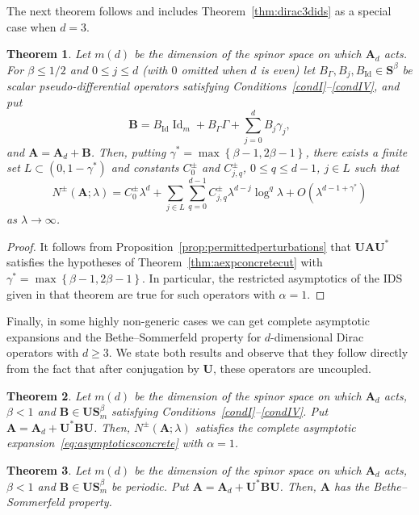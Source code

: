 \documentclass[10pt]{amsart}
\newtheorem{theo}{Theorem}[section]
\theoremstyle{definition}\newtheorem{defi}[theo]{Definition}\newtheorem{rema}[theo]{Remark}\newtheorem{exam}[theo]{Example}\newtheorem{nota}[theo]{Notation}
\DeclareMathOperator{\Id}{Id}
\newcommand{\BA}{\mathbf A}
\newcommand{\BB}{\mathbf B}
\newcommand{\BS}{\mathbf S}
\newcommand{\BU}{\mathbf U}
\newcommand{\bigo}[1]{O\left(#1 \right)}
\newcommand{\set}[1]{\left\{ #1 \right\}}
\begin{document}
The next theorem follows and includes Theorem~\ref{thm:dirac3dids} as a special case when $d = 3$.
\begin{theo}
Let $m(d)$ be the dimension of the spinor space on which $\BA_d$ acts. For $\beta \le 1/2$ and $0 \le j \le d$ (with $0$ omitted when $d$ is even) let $B_\Gamma, B_j, B_{\Id} \in \BS^\beta$ be scalar pseudo-differential operators satisfying Conditions~\ref{condI}--\ref{condIV}, and put
\begin{equation}
\BB = B_{\Id} \Id_m + B_\Gamma \Gamma + \sum_{j=0}^d B_j \gamma_j,
\end{equation}
and $\BA = \BA_d + \BB$. Then, putting $\gamma^* = \max \set{\beta - 1, 2
\beta - 1}$, there exists a finite set $L \subset (0, 1 - \gamma^*)$ and constants $C_0^\pm$ and $C_{j,q}^\pm$, $0 \le q \le d-1$, $j \in L$ such that
\begin{equation}
N^\pm(\BA;\lambda) = C_0^\pm \lambda^d + \sum_{j \in L} \sum_{q = 0}^{d-1} C_{j,q}^\pm \lambda^{d-j} \log^q \lambda + \bigo{\lambda^{d-1 + \gamma^*}}
\end{equation}
as $\lambda \to \infty$.
\end{theo}

\begin{proof}
It follows from Proposition~\ref{prop:permittedperturbations} that $\BU \BA \BU^*$ satisfies the hypotheses of Theorem~\ref{thm:aexpconcretecut} with $\gamma^* =
\max\set{\beta - 1, 2 \beta - 1}$. In particular, the restricted asymptotics of the IDS given in that theorem are true for such operators with $\alpha = 1$.
\end{proof}

Finally, in some highly non-generic cases we can get complete asymptotic expansions and the Bethe--Sommerfeld property for $d$-dimensional Dirac operators with $d \ge 3$. We state both results and observe that they follow directly from the fact that after conjugation by $\BU$, these operators are uncoupled.

\begin{theo}
Let $m(d)$ be the dimension of the spinor space on which $\BA_d$ acts, $\beta < 1$ and $\BB \in \BU\BS_m^\beta$ satisfying Conditions~\ref{condI}--\ref{condIV}. Put $\BA = \BA_d + \BU^* \BB \BU$. Then, $N^\pm(\BA;\lambda)$ satisfies the complete asymptotic expansion~\eqref{eq:asymptoticsconcrete} with $\alpha = 1$.
\end{theo}

\begin{theo}
Let $m(d)$ be the dimension of the spinor space on which $\BA_d$ acts, $\beta < 1$ and $\BB \in \BU\BS_m^\beta$ be periodic. Put $\BA = \BA_d + \BU^* \BB
\BU$. Then, $\BA$ has the Bethe--Sommerfeld property.
\end{theo}
\end{document}
